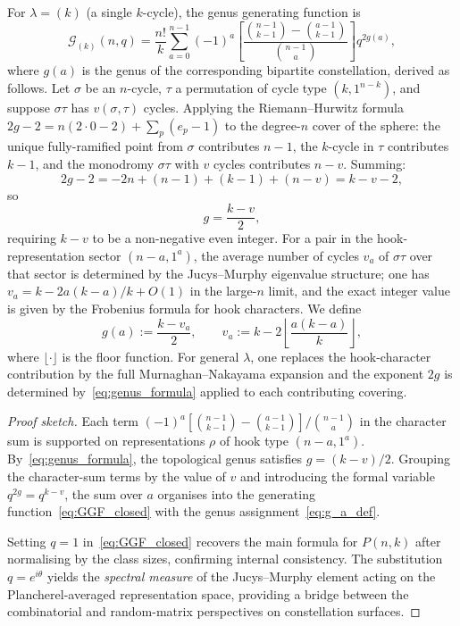 \begin{theorem}\label{thm:GGF}
For $\lambda=(k)$ (a single $k$-cycle), the genus generating function is
\begin{equation}\label{eq:GGF_closed}
  \mathcal{G}_{(k)}(n,q)
  = \frac{n!}{k}
    \sum_{a=0}^{n-1}(-1)^a
    \left[\frac{\binom{n-1}{k-1}-\binom{a-1}{k-1}}{\binom{n-1}{a}}\right]
    q^{2g(a)},
\end{equation}
where $g(a)$ is the genus of the corresponding bipartite constellation,
derived as follows.  Let $\sigma$ be an $n$-cycle, $\tau$ a permutation of
cycle type $(k,1^{n-k})$, and suppose $\sigma\tau$ has $v(\sigma,\tau)$
cycles.  Applying the Riemann--Hurwitz formula
$2g-2=n(2\cdot 0-2)+\sum_p(e_p-1)$ to the degree-$n$ cover of the sphere:
the unique fully-ramified point from $\sigma$ contributes $n-1$, the
$k$-cycle in $\tau$ contributes $k-1$, and the monodromy $\sigma\tau$ with
$v$ cycles contributes $n-v$.  Summing:
\[
  2g - 2 = -2n + (n-1) + (k-1) + (n-v) = k - v - 2,
\]
so
\begin{equation}\label{eq:genus_formula}
  g = \frac{k - v}{2},
\end{equation}
requiring $k-v$ to be a non-negative even integer.  For a pair in the
hook-representation sector $(n-a,1^a)$, the average number of cycles $v_a$
of $\sigma\tau$ over that sector is determined by the Jucys--Murphy
eigenvalue structure; one has $v_a = k - 2a(k-a)/k + O(1)$ in the large-$n$
limit, and the exact integer value is given by the Frobenius formula for hook
characters.  We define
\begin{equation}\label{eq:g_a_def}
  g(a) := \frac{k - v_a}{2},
  \qquad
  v_a := k - 2\!\left\lfloor\frac{a(k-a)}{k}\right\rfloor,
\end{equation}
where $\lfloor\cdot\rfloor$ is the floor function.  For general $\lambda$,
one replaces the hook-character contribution by the full Murnaghan--Nakayama
expansion and the exponent $2g$ is determined by~\eqref{eq:genus_formula}
applied to each contributing covering.
\end{theorem}
\begin{proof}[Proof sketch]
Each term $(-1)^a[\binom{n-1}{k-1}-\binom{a-1}{k-1}]/\binom{n-1}{a}$ in the
character sum is supported on representations $\rho$ of hook type $(n-a,1^a)$.
By~\eqref{eq:genus_formula}, the topological genus satisfies $g=(k-v)/2$.
Grouping the character-sum terms by the value of $v$ and introducing the
formal variable $q^{2g}=q^{k-v}$, the sum over $a$ organises into the
generating function~\eqref{eq:GGF_closed} with the genus
assignment~\eqref{eq:g_a_def}.

Setting $q=1$ in~\eqref{eq:GGF_closed} recovers the main formula for $P(n,k)$
after normalising by the class sizes, confirming internal consistency.  The
substitution $q=e^{i\theta}$ yields the \emph{spectral measure} of the
Jucys--Murphy element acting on the Plancherel-averaged representation space,
providing a bridge between the combinatorial and random-matrix perspectives
on constellation surfaces.
\end{proof}

